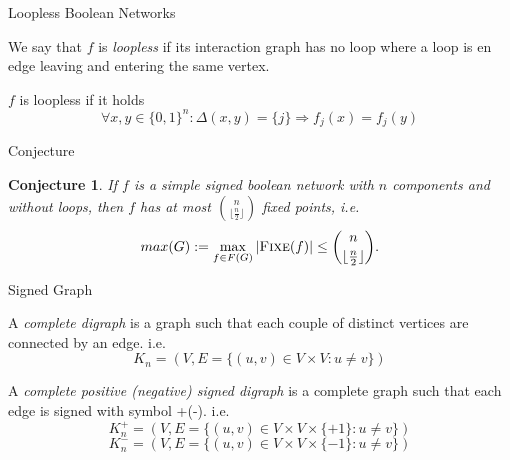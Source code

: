 \documentclass{beamer}
\newtheorem{conjecture}{Conjecture}
\newcommand{\floor}[1]{\lfloor #1 \rfloor}
\begin{document}
\begin{frame}{Loopless Boolean Networks}
\justifying
    \begin{definition}[Loopless $f$]
    We say that $f$ is \textit{loopless} if its interaction graph has no loop where a loop is en edge leaving and entering the same vertex.
    \end{definition}
    \begin{definition}
    $f$ is loopless if it holds
    \[
    \forall x,y \in \{0,1\}^n : \Delta(x,y)=\{j\} \Rightarrow f_j(x) = f_j(y)
    \]
    \end{definition}
\end{frame}


\begin{frame}{Conjecture}
\begin{conjecture}
\justifying
If $f$ is a simple signed boolean network with $n$ components and without loops, then $f$ has at most $\binom{n}{\floor{\frac{n}{2}}}$ fixed points, i.e. 
\[
max(G) := \max_{f \in F(G)} |\text{\textsc{Fixe}}(f)| \leq \binom{n}{\floor{\frac{n}{2}}}.
\]
\end{conjecture}
\end{frame}

\begin{frame}{Signed Graph}
\justifying
    \begin{definition}
    \justifying
    A \textit{complete digraph} is a graph such that each couple of distinct vertices are connected by an edge. i.e. 
    \[
        K_n = (V, E = \{ (u,v) \in V \times V : u \neq v \})
    \]
    \end{definition}
    
    \begin{definition}
    \justifying
    A \textit{complete positive (negative) signed digraph} is a complete graph such that each edge is signed with symbol +(-). i.e.
    \[ 
        K_n^+ = (V, E = \{ (u,v) \in V \times V \times \{+1\} : u \neq v \})
    \]
    \[
        K_n^- = (V, E = \{ (u,v) \in V \times V \times \{-1\} : u \neq v \})
    \]
    \end{definition}
    
\end{frame}
\end{document}
